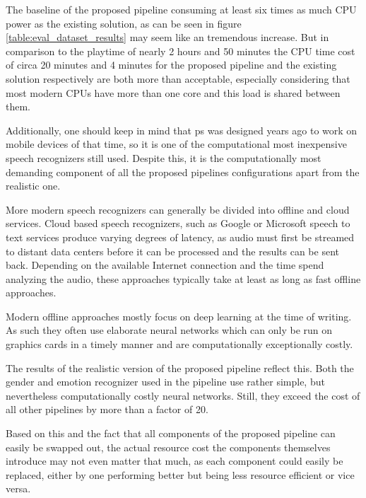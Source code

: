 { %
The baseline of the proposed pipeline consuming at least six times as much CPU power as the existing solution, as can be seen in figure \ref{table:eval_dataset_results} may seem like an tremendous increase.
But in comparison to the playtime of nearly 2 hours and 50 minutes the CPU time cost of circa 20 minutes and 4 minutes for the proposed pipeline and the existing solution respectively are both more than acceptable, especially considering that most modern CPUs have more than one core and this load is shared between them.

Additionally, one should keep in mind that \gls{ps} was designed years ago to work on mobile devices of that time, so it is one of the computational most inexpensive speech recognizers still used. 
Despite this, it is the computationally most demanding component of all the proposed pipelines configurations apart from the realistic one.

More modern speech recognizers can generally be divided into offline and cloud services.
Cloud based speech recognizers, such as Google \cite{GoogleSpeech} or Microsoft \cite{MicrosoftSpeech} speech to text services produce varying degrees of latency, as audio must first be streamed to distant data centers before it can be processed and the results can be sent back.
Depending on the available Internet connection and the time spend analyzing the audio, these approaches typically take at least as long as fast offline approaches.

Modern offline approaches mostly focus on deep learning at the time of writing. %
As such they often use elaborate neural networks which can only be run on graphics cards in a timely manner and are computationally exceptionally costly.

The results of the realistic version of the proposed pipeline reflect this.
Both the gender and emotion recognizer used in the pipeline use rather simple, but nevertheless computationally costly neural networks.
Still, they exceed the cost of all other pipelines by more than a factor of 20.

Based on this and the fact that all components of the proposed pipeline can easily be swapped out, the actual resource cost the components themselves introduce may not even matter that much, as each component could easily be replaced, either by one performing better but being less resource efficient or vice versa.
}



